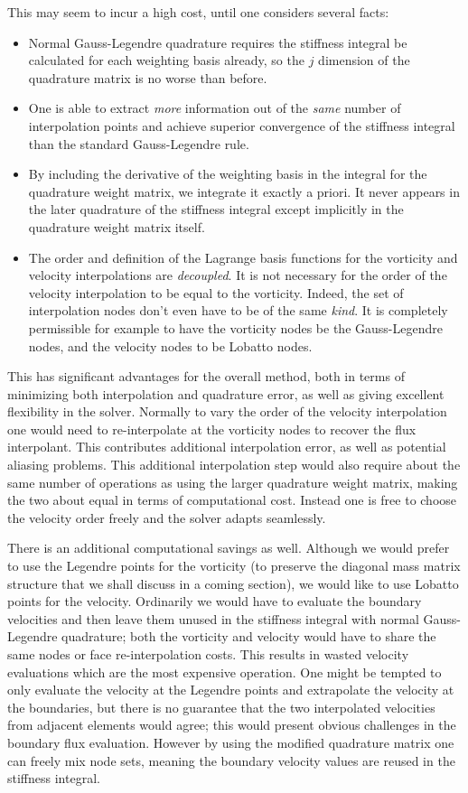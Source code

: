 \documentclass[letterpaper,12pt]{report}
\begin{document}
This may seem to incur a high cost, until one considers several facts:
\begin{itemize}
\item Normal Gauss-Legendre quadrature requires the stiffness integral be calculated for each weighting basis already, so the $j$ dimension of the quadrature matrix is no worse than before. 
\item One is able to extract \textit{more} information out of the \textit{same} number of interpolation points and achieve superior convergence of the stiffness integral than the standard Gauss-Legendre rule.
\item By including the derivative of the weighting basis in the integral for the quadrature weight matrix, we integrate it exactly a priori. It never appears in the later quadrature of the stiffness integral except implicitly in the quadrature weight matrix itself.
\item The order and definition of the Lagrange basis functions for the vorticity and velocity interpolations are \textit{decoupled}. It is not necessary for the order of the velocity interpolation to be equal to the vorticity. Indeed, the set of interpolation nodes don't even have to be of the same \textit{kind}. It is completely permissible for example to have the vorticity nodes be the Gauss-Legendre nodes, and the velocity nodes to be Lobatto nodes.
\end{itemize}

This has significant advantages for the overall method, both in terms of minimizing both interpolation and quadrature error, as well as giving excellent flexibility in the solver. Normally to vary the order of the velocity interpolation one would need to re-interpolate at the vorticity nodes to recover the flux interpolant. This contributes additional interpolation error, as well as potential aliasing problems. This additional interpolation step would also require about the same number of operations as using the larger quadrature weight matrix, making the two about equal in terms of computational cost. Instead one is free to choose the velocity order freely and the solver adapts seamlessly.

There is an additional computational savings as well. Although we would prefer to use the Legendre points for the vorticity (to preserve the diagonal mass matrix structure that we shall discuss in a coming section), we would like to use Lobatto points for the velocity. Ordinarily we would have to evaluate the boundary velocities and then leave them unused in the stiffness integral with normal Gauss-Legendre quadrature; both the vorticity and velocity would have to share the same  nodes or face re-interpolation costs. This results in wasted velocity evaluations which are the most expensive operation. One might be tempted to only evaluate the velocity at the Legendre points and extrapolate the velocity at the boundaries, but there is no guarantee that the two interpolated velocities from adjacent elements would agree; this would present obvious challenges in the boundary flux evaluation. However by using the modified quadrature matrix one can freely mix node sets, meaning the boundary velocity values are reused in the stiffness integral.
\end{document}
